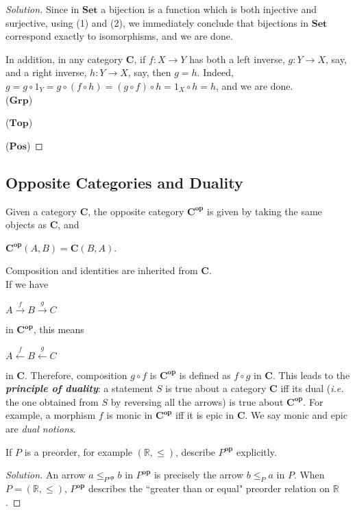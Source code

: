 \documentclass[]{amsbook}
\newcommand{\catname}[1]{\mathbf{#1}}
\newcommand{\R}{\mathbb{R}}
\newenvironment{solution}
    {\begin{proof}[Solution]}{\end{proof}}
\begin{document}
\begin{solution}
    Since in $\catname{Set}$ a bijection is a function which is both injective
    and surjective, using (1) and (2), we immediately conclude that bijections
    in $\catname{Set}$ correspond exactly to isomorphisms, and we are done.

    In addition, in any category $\catname{C}$, if $f: X \to Y$ has both a left
    inverse, $g: Y \to X$, say, and a right inverse, $h: Y \to X$, say, then
    $g = h$. Indeed, $g = g \circ 1_Y = g \circ (f \circ h) = (g \circ f) \circ
    h = 1_X \circ h = h$, and we are done.\\

    ($\catname{Grp}$)

    ($\catname{Top}$)

    ($\catname{Pos}$)
\end{solution}

\subsection*{Opposite Categories and Duality}
Given a category $\catname{C}$, the opposite category $\catname{C}^{\mathbf{op}}$
is given by taking the same objects as $\catname{C}$, and
\begin{center}
    $\catname{C}^{\mathbf{op}}(A, B) = \catname{C}(B, A)$.
\end{center}

Composition and identities are inherited from $\catname{C}$.\\
If we have
\begin{center}
    $A \xrightarrow{f} B \xrightarrow{g} C$
\end{center}
in $\catname{C}^{\mathbf{op}}$, this means
\begin{center}
    $A \xleftarrow{f} B \xleftarrow{g} C$
\end{center}
in $\catname{C}$. Therefore, composition $ g \circ f$ is
$\catname{C}^{\mathbf{op}}$ is defined as $f \circ g$ in $\catname{C}$. This
leads to the \emph{\textbf{principle of duality}}: a statement $S$ is true
about a category $\catname{C}$ iff its dual (\emph{i.e.} the one obtained
from $S$ by reversing all the arrows) is true about $\catname{C}^{\mathbf{op}}$.
For example, a morphism $f$ is monic in $\catname{C}^{\mathbf{op}}$ iff it is
epic in $\catname{C}$. We say monic and epic are \emph{dual notions}.

\setcounter{Exercise}{13}
\begin{Exercise}
    If $P$ is a preorder, for example $(\R, \le)$, describe $P^{\mathbf{op}}$
    explicitly.
\end{Exercise}
\begin{solution}
    An arrow $a \le_{P^{\mathbf{op}}} b$ in $P^{\mathbf{op}}$ is precisely the
    arrow $b \le_P a$ in $P$. When $P = (\R, \le)$, $P^{\mathbf{op}}$ describes
    the ``greater than or equal" preorder relation on $\R$.
\end{solution}
\end{document}
